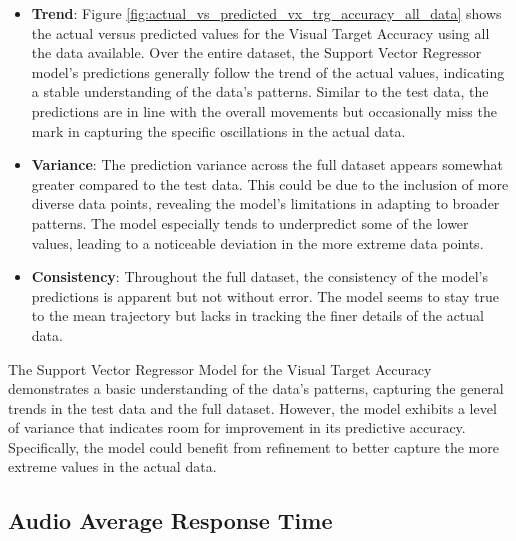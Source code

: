 \begin{itemize}
    \item \textbf{Trend}: Figure \ref{fig:actual_vs_predicted_vx_trg_accuracy_all_data} shows the actual versus predicted values for the Visual Target Accuracy using all the data available. Over the entire dataset,
    the Support Vector Regressor model's predictions generally follow the trend of the actual values, indicating a stable understanding of the data's patterns. Similar to the test data, the predictions are in line with the
    overall movements but occasionally miss the mark in capturing the specific oscillations in the actual data.
    
    \item \textbf{Variance}: The prediction variance across the full dataset appears somewhat greater compared to the test data. This could be due to the inclusion of more diverse data points, revealing the model's 
    limitations in adapting to broader patterns. The model especially tends to underpredict some of the lower values, leading to a noticeable deviation in the more extreme data points.
    
    \item \textbf{Consistency}: Throughout the full dataset, the consistency of the model's predictions is apparent but not without error. The model seems to stay true to the mean trajectory but lacks in tracking the 
    finer details of the actual data. 
        
\end{itemize}

The Support Vector Regressor Model for the Visual Target Accuracy demonstrates a basic understanding of the data's patterns, capturing the general trends in the test data and the full dataset. However, the model exhibits
a level of variance that indicates room for improvement in its predictive accuracy. Specifically, the model could benefit from refinement to better capture the more extreme values in the actual data.

\subsection*{Audio Average Response Time}

